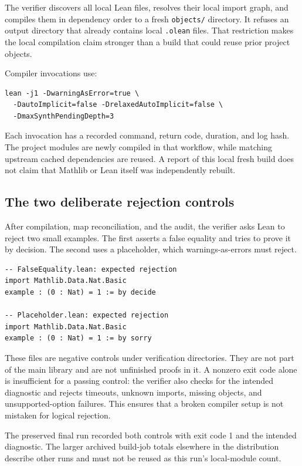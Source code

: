 \documentclass[11pt,a4paper]{article}
\newcommand{\code}[1]{\nolinkurl{#1}}
\begin{document}
The verifier discovers all local Lean files, resolves their local import graph, and compiles them in dependency order to a fresh \code{objects/} directory. It refuses an output directory that already contains local \code{.olean} files. That restriction makes the local compilation claim stronger than a build that could reuse prior project objects.

Compiler invocations use:
\begin{lstlisting}
lean -j1 -DwarningAsError=true \
  -DautoImplicit=false -DrelaxedAutoImplicit=false \
  -DmaxSynthPendingDepth=3
\end{lstlisting}

Each invocation has a recorded command, return code, duration, and log hash. The project modules are newly compiled in that workflow, while matching upstream cached dependencies are reused. A report of this local fresh build does not claim that Mathlib or Lean itself was independently rebuilt.

\subsection{The two deliberate rejection controls}

After compilation, map reconciliation, and the audit, the verifier asks Lean to reject two small examples. The first asserts a false equality and tries to prove it by decision. The second uses a placeholder, which warnings-as-errors must reject.
\begin{lstlisting}
-- FalseEquality.lean: expected rejection
import Mathlib.Data.Nat.Basic
example : (0 : Nat) = 1 := by decide

-- Placeholder.lean: expected rejection
import Mathlib.Data.Nat.Basic
example : (0 : Nat) = 1 := by sorry
\end{lstlisting}

These files are negative controls under verification directories. They are not part of the main library and are not unfinished proofs in it. A nonzero exit code alone is insufficient for a passing control: the verifier also checks for the intended diagnostic and rejects timeouts, unknown imports, missing objects, and unsupported-option failures. This ensures that a broken compiler setup is not mistaken for logical rejection.

The preserved final run recorded both controls with exit code 1 and the intended diagnostic. The larger archived build-job totals elsewhere in the distribution describe other runs and must not be reused as this run's local-module count.
\end{document}
